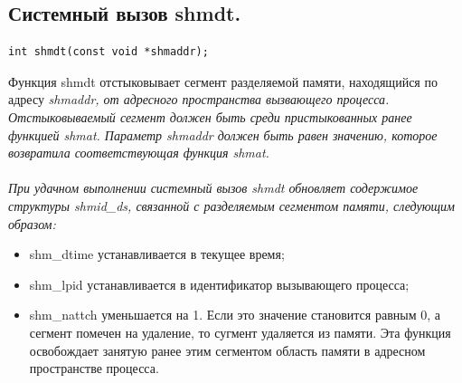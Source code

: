 \documentclass[a4paper]{article}
\begin{document}
\subsection{\Large Системный вызов shmdt.}
\begin{verbatim}
int shmdt(const void *shmaddr);
\end{verbatim}
Функция shmdt отстыковывает сегмент разделяемой памяти, находящийся по адресу \sl shmaddr, \rm от адресного пространства вызвающего процесса. Отстыковываемый сегмент должен быть среди пристыкованных ранее функцией shmat. Параметр \sl shmaddr \rm должен быть равен значению, которое возвратила соответствующая функция shmat.\\\\
При удачном выполнении системный вызов shmdt обновляет содержимое структуры shmid\_ds, связанной с разделяемым сегментом памяти, следующим образом:
\begin{itemize}
  \item shm\_dtime устанавливается в текущее время;
  \item shm\_lpid устанавливается в идентификатор вызывающего процесса;
  \item shm\_nattch уменьшается на 1. Если это значение становится равным 0, а сегмент помечен на удаление, то сугмент удаляется из памяти. Эта функция освобождает занятую ранее этим сегментом область памяти в адресном пространстве процесса.
\end{itemize}
\end{document}
